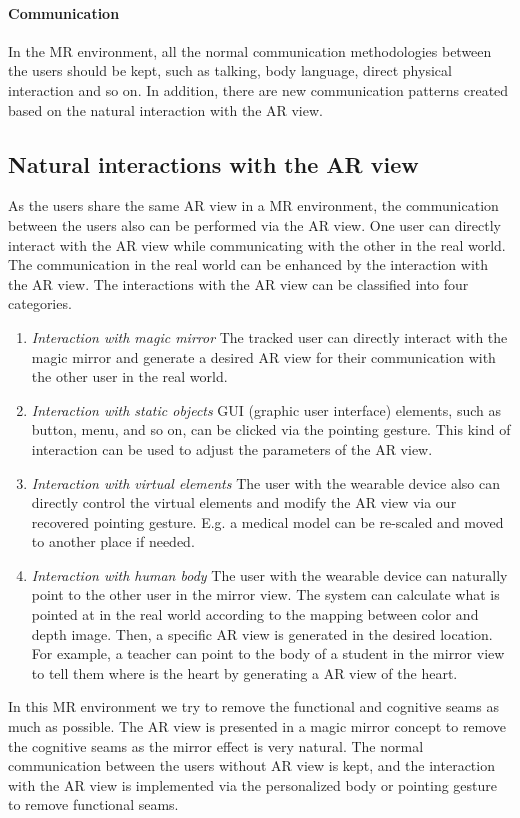 \paragraph{Communication}
In the MR environment, all the normal communication methodologies between the users should be kept, such as talking, body language, direct physical interaction and so on.
In addition, there are new communication patterns created based on the natural interaction with the AR view.

\subsection{Natural interactions with the AR view} 
As the users share the same AR view in a MR environment, the communication between the users also can be performed via the AR view. One user can directly interact with the AR view while communicating with the other in the real world. The communication in the real world can be enhanced by the interaction with the AR view.
The interactions with the AR view can be classified into four categories.
\begin{enumerate}
	\item \emph{Interaction with magic mirror} The tracked user can directly interact with the magic mirror and generate a desired AR view for their communication with the other user in the real world.
	\item \emph{Interaction with static objects} GUI (graphic user interface) elements, such as button, menu, and so on, can be clicked via the pointing gesture. This kind of interaction can be used to adjust the parameters of the AR view. 
	\item \emph {Interaction with virtual elements} The user with the wearable device also can directly control the virtual elements and modify the AR view via our recovered pointing gesture. E.g. a medical model can be re-scaled and moved to another place if needed.
	\item \emph{Interaction with human body} The user with the wearable device can naturally point to the other user in the mirror view. The system can calculate what is pointed at in the real world according to the mapping between color and depth image. Then, a specific AR view is generated in the desired location. For example, a teacher can point to the body of a student in the mirror view to tell them where is the heart by generating a AR view of the heart.
\end{enumerate}

In this MR environment we try to remove the functional and cognitive seams as much as possible.
The AR view is presented in a magic mirror concept to remove the cognitive seams as the mirror effect is very natural. The normal communication between the users without AR view is kept, and the interaction with the AR view is implemented via the personalized body or pointing gesture to remove functional seams.

